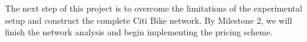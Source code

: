 \documentclass[times, 10pt,twocolumn]{article}
\begin{document}
The next step of this project is to overcome the limitations of the experimental setup and construct the complete Citi Bike network. By Milestone 2, we will finish the network analysis and begin implementing the pricing scheme.

%
%
%
%
%
%
\end{document}
